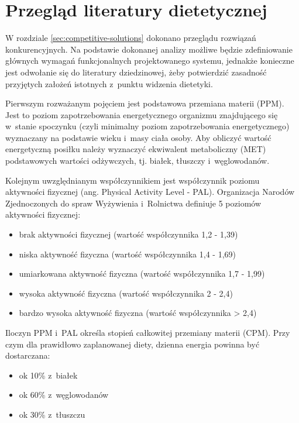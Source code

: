 \section{Przegląd literatury dietetycznej}\label{sec:domain-literature}

W rozdziale \ref{sec:competitive-solutions} dokonano przeglądu rozwiązań konkurencyjnych.
Na podstawie dokonanej analizy możliwe będzie zdefiniowanie głównych wymagań funkcjonalnych projektowanego systemu,
jednakże konieczne jest odwołanie się do literatury dziedzinowej, żeby potwierdzić zasadność przyjętych założeń istotnych z~punktu widzenia dietetyki.

\par
Pierwszym rozważanym pojęciem jest podstawowa przemiana materii (PPM).
Jest to poziom zapotrzebowania energetycznego organizmu znajdującego się w~stanie spoczynku (czyli minimalny poziom zapotrzebowania energetycznego)
wyznaczany na podstawie wieku i~masy ciała osoby.
Aby obliczyć wartość energetyczną posiłku należy wyznaczyć ekwiwalent metaboliczny (MET) podstawowych wartości odżywczych,
tj. białek, tłuszczy i~węglowodanów\cite{book:dietetyka-zywienie-zdrowego-i-chorego-czlowieka}.

\par
Kolejnym uwzględnianym współczynnikiem jest współczynnik poziomu aktywności fizycznej (ang. Physical Activity Level - PAL).
Organizacja Narodów Zjednoczonych do spraw Wyżywienia i~Rolnictwa definiuje 5 poziomów aktywności fizycznej\cite{url:fao-pal}:
\begin{itemize}
    \item brak aktywności fizycznej (wartość współczynnika 1,2 - 1,39)
    \item niska aktywność fizyczna (wartość współczynnika 1,4 - 1,69)
    \item umiarkowana aktywność fizyczna (wartość współczynnika 1,7 - 1,99)
    \item wysoka aktywność fizyczna (wartość współczynnika 2 - 2,4)
    \item bardzo wysoka aktywność fizyczna (wartość współczynnika > 2,4)
\end{itemize}

\par
Iloczyn PPM i~PAL określa stopień całkowitej przemiany materii (CPM)\cite{book:normy-zywienia-czlowieka}.
Przy czym dla prawidłowo zaplanowanej diety, dzienna energia powinna być dostarczana:
\begin{itemize}
    \item ok 10\% z~białek
    \item ok 60\% z~węglowodanów
    \item ok 30\% z~tłuszczu
\end{itemize}

